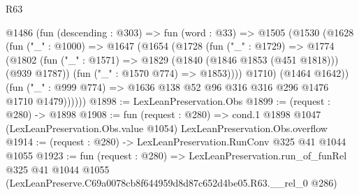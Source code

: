 \begin{lexlean}{R63}
\begin{coremodule}
      @1486
        (fun (descending : @303) =>
        fun (word : @33) =>
        @1505
          (@1530
            (@1628
              (fun ("_" : @1000) =>
              @1647
                (@1654
                  (@1728
                    (fun ("_" : @1729) =>
                    @1774
                      (@1802
                        (fun ("_" : @1571) => @1829 (@1840 (@1846 @1853 (@451 @1818))) (@939 @1787))
                        (fun ("_" : @1570 @774) => @1853))))
                  @1710)
                (@1464 @1642))
              (fun ("_" : @999 @774) => @1636 @138 @52 @96 @316 @316 @296 @1476 @1710 @1479))))))
@1898 := LexLeanPreservation.Obs
@1899 := (request : @280) -> @1898
@1908 := fun (request : @280) =>
  cond.{1} @1898 @1047 (LexLeanPreservation.Obs.value @1054) LexLeanPreservation.Obs.overflow
@1914 := (request : @280) -> LexLeanPreservation.RunConv @325 @41 @1044 @1055
@1923 := fun (request : @280) =>
  LexLeanPreservation.run_of_funRel
    @325
    @41
    @1044
    @1055
    (LexLeanPreserve.C69a0078cb8f644959d8d87c652d4be05.R63.__rel_0 @286)
\end{coremodule}
\end{lexlean}
